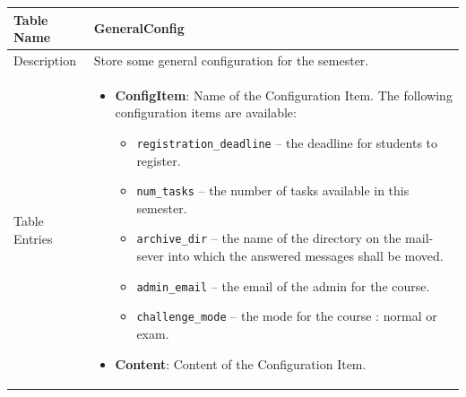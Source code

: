 \begin{tabular}{|p{3cm}|p{10cm}|}
\hline
Table Name & GeneralConfig \\
\hline
Description & Store some general configuration for the semester.\\
\hline
Table Entries & \begin{itemize}
    \item {\bf ConfigItem}: Name of the Configuration Item.
        The following configuration items are available:
        \begin{itemize}
        \item {\tt registration\_deadline} -- the deadline for students to register.
        \item {\tt num\_tasks} -- the number of tasks available in this semester.
        \item {\tt archive\_dir} -- the name of the directory on the mail-sever into
            which the answered messages shall be moved.
        \item {\tt admin\_email} -- the email of the admin for the course.
        \item {\tt challenge\_mode} -- the mode for the course : normal or exam.
        \end{itemize}
    \item {\bf Content}: Content of the Configuration Item.
    \end{itemize} \\
\hline
\end{tabular}
